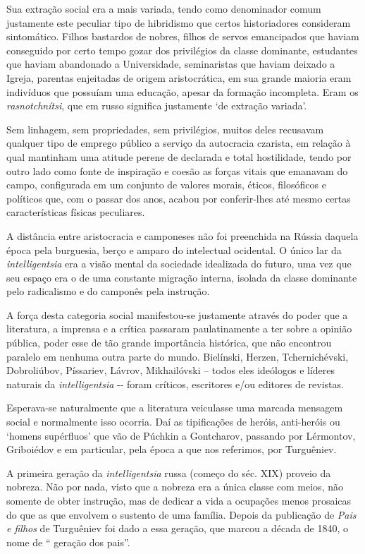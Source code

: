 Sua extração social era a mais variada, tendo como denominador comum
justamente este peculiar tipo de hibridismo que certos historiadores
consideram sintomático. Filhos bastardos de nobres, filhos de servos
emancipados que haviam conseguido por certo tempo gozar dos privilégios
da classe dominante, estudantes que haviam abandonado a Universidade,
seminaristas que haviam deixado a Igreja, parentas enjeitadas de origem
aristocrática, em sua grande maioria eram indivíduos que possuíam uma
educação, apesar da formação incompleta. Eram os \emph{rasnotchnítsi},
que em russo significa justamente `de extração variada'.

Sem linhagem, sem propriedades, sem privilégios, muitos deles recusavam
qualquer tipo de emprego público a serviço da autocracia czarista, em
relação à qual mantinham uma atitude perene de declarada e total
hostilidade, tendo por outro lado como fonte de inspiração e coesão as
forças vitais que emanavam do campo, configurada em um conjunto de
valores morais, éticos, filosóficos e políticos que, com o passar dos
anos, acabou por conferir-lhes até mesmo certas características físicas
peculiares.

A distância entre aristocracia e camponeses não foi preenchida na Rússia
daquela época pela burguesia, berço e amparo do intelectual ocidental. O
único lar da \emph{intelligentsia} era a visão mental da sociedade
idealizada do futuro, uma vez que seu espaço era o de uma constante
migração interna, isolada da classe dominante pelo radicalismo e do
camponês pela instrução.

A força desta categoria social manifestou-se justamente através do poder
que a literatura, a imprensa e a crítica passaram paulatinamente a ter
sobre a opinião pública, poder esse de tão grande importância histórica,
que não encontrou paralelo em nenhuma outra parte do mundo. Bielínski,
Herzen, Tchernichévski, Dobroliúbov, Píssariev, Lávrov, Mikhailóvski --
todos eles ideólogos e líderes naturais da \emph{intelligentsia} -\/-
foram críticos, escritores e/ou editores de revistas.

Esperava-se naturalmente que a literatura veiculasse uma marcada
mensagem social e normalmente isso ocorria. Daí as tipificações de
heróis, anti-heróis ou `homens supérfluos' que vão de Púchkin a
Gontcharov, passando por Lérmontov, Griboiédov e em particular, pela
época a que nos referimos, por Turguêniev.

A primeira geração da \emph{intelligentsia} { } russa (começo do séc.
XIX) proveio da nobreza. Não por nada, visto que a nobreza era a única
classe com meios, não somente de obter instrução, mas de dedicar a vida
a ocupações menos prosaicas do que as que envolvem o sustento de uma
família. Depois da publicação de \emph{Pais e filhos} de Turguêniev foi
dado a essa geração, que marcou a década de 1840, o nome de `` geração
dos pais''.

